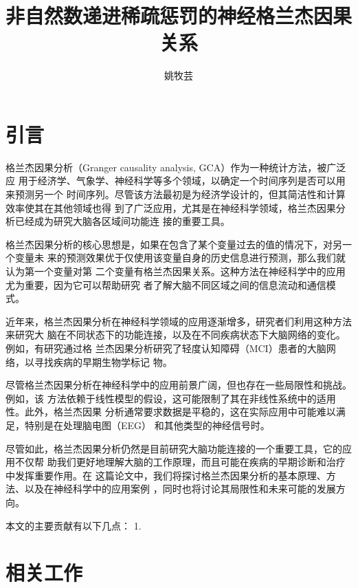 \documentclass[11pt]{article} %
\title{非自然数递进稀疏惩罚的神经格兰杰因果关系}
\author{姚牧芸}
\begin{document}
\maketitle

\section{引言}

格兰杰因果分析（Granger causality analysis, GCA）作为一种统计方法，被广泛应
用于经济学、气象学、神经科学等多个领域，以确定一个时间序列是否可以用来预测另一个
时间序列。尽管该方法最初是为经济学设计的，但其简洁性和计算效率使其在其他领域也得
到了广泛应用，尤其是在神经科学领域，格兰杰因果分析已经成为研究大脑各区域间功能连
接的重要工具。 

格兰杰因果分析的核心思想是，如果在包含了某个变量过去的值的情况下，对另一个变量未
来的预测效果优于仅使用该变量自身的历史信息进行预测，那么我们就认为第一个变量对第
二个变量有格兰杰因果关系。这种方法在神经科学中的应用尤为重要，因为它可以帮助研究
者了解大脑不同区域之间的信息流动和通信模式。 

近年来，格兰杰因果分析在神经科学领域的应用逐渐增多，研究者们利用这种方法来研究大
脑在不同状态下的功能连接，以及在不同疾病状态下大脑网络的变化。例如，有研究通过格
兰杰因果分析研究了轻度认知障碍（MCI）患者的大脑网络，以寻找疾病的早期生物学标记
物。 

尽管格兰杰因果分析在神经科学中的应用前景广阔，但也存在一些局限性和挑战。例如，该
方法依赖于线性模型的假设，这可能限制了其在非线性系统中的适用性。此外，格兰杰因果
分析通常要求数据是平稳的，这在实际应用中可能难以满足，特别是在处理脑电图（EEG）
和其他类型的神经信号时。 

尽管如此，格兰杰因果分析仍然是目前研究大脑功能连接的一个重要工具，它的应用不仅帮
助我们更好地理解大脑的工作原理，而且可能在疾病的早期诊断和治疗中发挥重要作用。在
这篇论文中，我们将探讨格兰杰因果分析的基本原理、方法、以及在神经科学中的应用案例
，同时也将讨论其局限性和未来可能的发展方向。

本文的主要贡献有以下几点：
1.

\section{相关工作}
\end{document}
